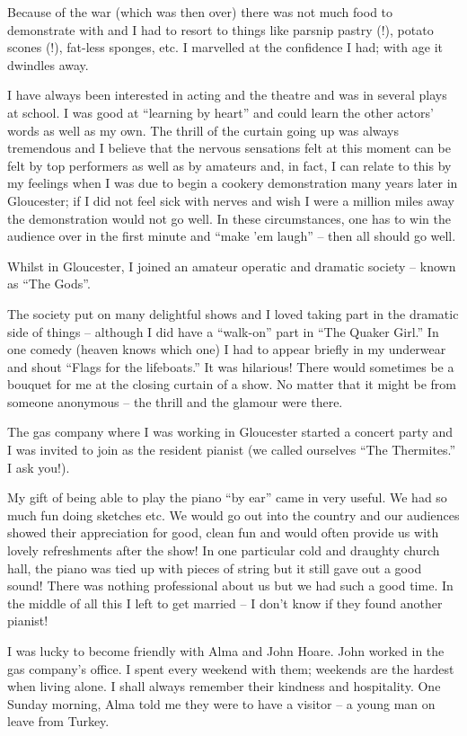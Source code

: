 Because of the war (which was then over) there was not much food to
demonstrate with and I had to resort to things like parsnip pastry
(!), potato scones (!), fat-less sponges, etc. I marvelled at the
confidence I had; with age it dwindles away.

I have always been interested in acting and the theatre and was in
several plays at school. I was good at ``learning by heart'' and could
learn the other actors' words as well as my own. The thrill of the
curtain going up was always tremendous and I believe that the nervous
sensations felt at this moment can be felt by top performers as well
as by amateurs and, in fact, I can relate to this by my feelings when
I was due to begin a cookery demonstration many years later in
Gloucester; if I did not feel sick with nerves and wish I were a
million miles away the demonstration would not go well. In these
circumstances, one has to win the audience over in the first minute
and ``make 'em laugh'' -- then all should go well.

Whilst in Gloucester, I joined an amateur operatic and dramatic
society -- known as ``The Gods''.

The society put on many delightful shows and I loved taking part in
the dramatic side of things -- although I did have a ``walk-on'' part
in ``The Quaker Girl.'' In one comedy (heaven knows which one) I had
to appear briefly in my underwear and shout ``Flags for the
lifeboats.'' It was hilarious! There would sometimes be a bouquet for
me at the closing curtain of a show. No matter that it might be from
someone anonymous -- the thrill and the glamour were there.

The gas company where I was working in Gloucester started a concert
party and I was invited to join as the resident pianist (we called
ourselves ``The Thermites.'' I ask you!).

My gift of being able to play the piano ``by ear'' came in very
useful. We had so much fun doing sketches etc. We would go out into
the country and our audiences showed their appreciation for good,
clean fun and would often provide us with lovely refreshments after
the show! In one particular cold and draughty church hall, the piano
was tied up with pieces of string but it still gave out a good sound!
There was nothing professional about us but we had such a good
time. In the middle of all this I left to get married -- I don't know
if they found another pianist!

I was lucky to become friendly with Alma and John Hoare. John worked
in the gas company's office. I spent every weekend with them; weekends
are the hardest when living alone. I shall always remember their
kindness and hospitality. One Sunday morning, Alma told me they were
to have a visitor -- a young man on leave from Turkey.


